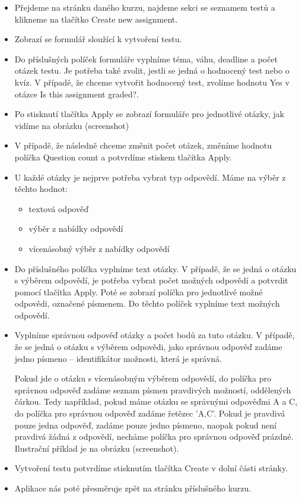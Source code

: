 \begin{itemize}
	\item Přejdeme na stránku daného kurzu, najdeme sekci se seznamem testů a klikneme na tlačítko Create new assignment.
	\item Zobrazí se formulář sloužící k vytvoření testu. 
	\item Do příslušných políček formuláře vyplníme téma, váhu, deadline a počet otázek testu. Je potřeba také zvolit, jestli se jedná o hodnocený test nebo o kvíz. V případě, že chceme vytvořit hodnocený test, zvolíme hodnotu Yes v otázce Is this assignment graded?.
	\item Po stisknutí tlačítka Apply se zobrazí formuláře pro jednotlivé otázky, jak vidíme na obrázku (screenshot)
	\item V případě, že následně chceme změnit počet otázek, změníme hodnotu políčka Question count a potvrdíme stiskem tlačítka Apply.
	\item U každé otázky je nejprve potřeba vybrat typ odpovědí. Máme na výběr z těchto hodnot:
		\begin{itemize}
			\item textová odpověď
			\item výběr z nabídky odpovědí
			\item vícenásobný výběr z nabídky odpovědí
		\end{itemize}
	\item Do příslušného políčka vyplníme text otázky. V případě, že se jedná o otázku s výběrem odpovědí, je potřeba vybrat počet možných odpovědí a potvrdit pomocí tlačítka Apply. Poté se zobrazí políčka pro jednotlivé možné odpovědi, označené písmenem. Do těchto políček vyplníme text možných odpovědí.
	\item Vyplníme správnou odpověď otázky a počet bodů za tuto otázku. V případě, že se jedná o otázku s výběrem odpovědi, jako správnou odpověď zadáme jedno písmeno -- identifikátor možnosti, která je správná. 
	
	Pokud jde o otázku s vícenásobným výběrem odpovědí, do políčka pro správnou odpověď zadáme seznam písmen pravdivých možností, oddělených čárkou. Tedy například, pokud máme otázku se správnými odpověďmi A a C, do políčka pro správnou odpověď zadáme řetězec 'A,C'. Pokud je pravdivá pouze jedna odpověď, zadáme pouze jedno písmeno, naopak pokud není pravdivá žádná z odpovědí, necháme políčka pro správnou odpověď prázdné. Ilustrační příklad je na obrázku (screenshot).
	\item Vytvoření testu potvrdíme stisknutím tlačítka Create v dolní části stránky.
	\item Aplikace nás poté přesměruje zpět na stránku příslušného kurzu.
\end{itemize}

